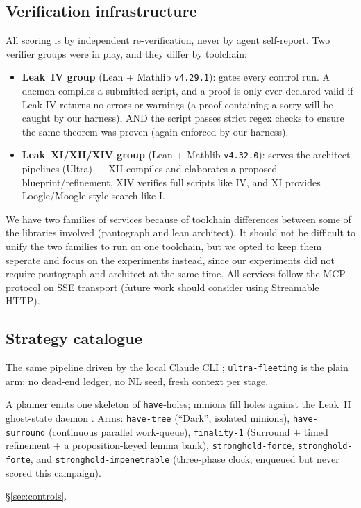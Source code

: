 \documentclass[12pt, a4paper]{article}
\newcommand{\run}[1]{\texttt{#1}}
\begin{document}
\subsection{Verification infrastructure}
\label{sec:verifiers}

All scoring is by independent re-verification, never by agent self-report.
Two verifier groups were in play, and they differ by toolchain:

\begin{itemize}[itemsep=1pt]
  \item \textbf{Leak~IV group} (Lean + Mathlib \texttt{v4.29.1}): gates every
        control run. A daemon compiles a submitted script, and a proof is only ever
        declared valid if Leak-IV returns no errors or warnings (a proof containing a sorry
        will be caught by our harness), AND the script passes strict
        regex checks to ensure the same theorem was proven (again enforced by our harness).
  \item \textbf{Leak~XI/XII/XIV group} (Lean + Mathlib \texttt{v4.32.0}):
        serves the architect pipelines (Ultra) --- XII compiles and
        elaborates a proposed blueprint/refinement, XIV verifies full scripts like IV, and XI provides Loogle/Moogle-style
        search \cite{loogle,moogle} like I.
\end{itemize}

\noindent
We have two families of services because of toolchain differences between some of the libraries involved (pantograph and lean architect).
It should not be difficult to unify the two families to run on one toolchain, but we opted to keep them seperate and
focus on the experiments instead, since our experiments did not require pantograph and architect at the same time. 
All services follow the MCP protocol on SSE transport \cite{anthropic2024mcp} (future work should consider using Streamable HTTP).

\subsection{Strategy catalogue}
\label{sec:strategies}

\begin{description}[itemsep=2pt]
  \item[Ultra (Claude CLI driver).] The same pipeline driven by the local
        Claude CLI \cite{anthropic2026sonnet5}; \run{ultra-fleeting} is the
        plain arm: no dead-end ledger, no NL seed, fresh context per stage.
  \item[Stronghold (flat-skeleton family).] A planner emits one skeleton of
        \texttt{have}-holes; minions fill holes against the Leak~II ghost-state
        daemon \cite{shen2026snapshot}. Arms: \run{have-tree} (``Dark'',
        isolated minions), \run{have-surround} (continuous parallel work-queue),
        \run{finality-1} (Surround + timed refinement + a proposition-keyed
        lemma bank), \run{stronghold-force}, \run{stronghold-forte}, and
        \run{stronghold-impenetrable} (three-phase clock; enqueued but never
        scored this campaign).
  \item[Controls.] \S\ref{sec:controls}.
\end{description}
\end{document}
